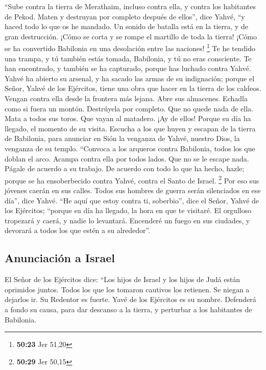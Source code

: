  ``Sube contra la tierra de Merathaim, incluso contra
ella, y contra los habitantes de Pekod. Maten y destruyan por completo
después de ellos'', dice Yahvé, ``y haced todo lo que os he mandado.
 Un sonido de batalla está en la tierra, y de gran
destrucción.  ¡Cómo se corta y se rompe el martillo de
toda la tierra! ¡Cómo se ha convertido Babilonia en una desolación entre
las naciones! \footnote{\textbf{50:23} Jer 51,20}  Te he
tendido una trampa, y tú también estás tomada, Babilonia, y tú no eras
consciente. Te han encontrado, y también se ha capturado, porque has
luchado contra Yahvé.  Yahvé ha abierto su arsenal, y ha
sacado las armas de su indignación; porque el Señor, Yahvé de los
Ejércitos, tiene una obra que hacer en la tierra de los caldeos.
 Vengan contra ella desde la frontera más lejana. Abre
sus almacenes. Echadla como si fuera un montón. Destrúyela por completo.
Que no quede nada de ella.  Mata a todos sus toros. Que
vayan al matadero. ¡Ay de ellos! Porque su día ha llegado, el momento de
su visita.  Escucha a los que huyen y escapan de la
tierra de Babilonia, para anunciar en Sión la venganza de Yahvé, nuestro
Dios, la venganza de su templo.  ``Convoca a los arqueros
contra Babilonia, todos los que doblan el arco. Acampa contra ella por
todos lados. Que no se le escape nada. Págale de acuerdo a su trabajo.
De acuerdo con todo lo que ha hecho, hazle; porque se ha ensoberbecido
contra Yahvé, contra el Santo de Israel. \footnote{\textbf{50:29} Jer
  50,15}  Por eso sus jóvenes caerán en sus calles. Todos
sus hombres de guerra serán silenciados en ese día'', dice Yahvé.
 ``He aquí que estoy contra ti, soberbio'', dice el
Señor, Yahvé de los Ejércitos; ``porque su día ha llegado, la hora en
que te visitaré.  El orgulloso tropezará y caerá, y nadie
lo levantará. Encenderé un fuego en sus ciudades, y devorará a todos los
que estén a su alrededor''.

\hypertarget{anunciaciuxf3n-a-israel}{%
\subsection{Anunciación a Israel}\label{anunciaciuxf3n-a-israel}}

 El Señor de los Ejércitos dice: ``Los hijos de Israel y
los hijos de Judá están oprimidos juntos. Todos los que los tomaron
cautivos los retienen. Se niegan a dejarlos ir.  Su
Redentor es fuerte. Yavé de los Ejércitos es su nombre. Defenderá a
fondo su causa, para dar descanso a la tierra, y perturbar a los
habitantes de Babilonia.

